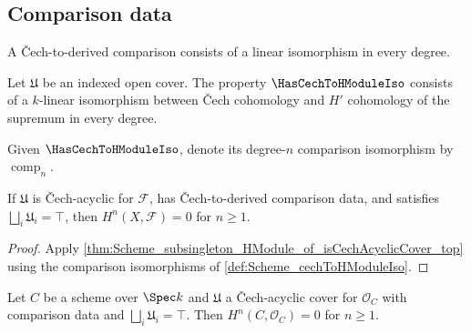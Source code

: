 \subsection{Comparison data}

A \v{C}ech-to-derived comparison consists of a linear isomorphism in every degree.

\begin{definition}\leanok
  \label{def:Scheme_HasCechToHModuleIso}

  Let \(\mathfrak U\) be an indexed open cover. The property \(\HasCechToHModuleIso\) consists of a \(k\)-linear isomorphism between \v{C}ech cohomology and \(H'\) cohomology of the supremum in every degree.
\end{definition}

\begin{definition}\leanok
  \label{def:Scheme_cechToHModuleIso}

  Given \(\HasCechToHModuleIso\), denote its degree-\(n\) comparison isomorphism by \(\operatorname{comp}_n\).
\end{definition}

\begin{theorem}\leanok
  \label{thm:Scheme_subsingleton_HModule_of_hasCechToHModuleIso_top}

  If \(\mathfrak U\) is \v{C}ech-acyclic for \(\mathcal F\), has \v{C}ech-to-derived comparison data, and satisfies \(\bigsqcup_i\mathfrak U_i=\top\), then \(H^n(X,\mathcal F)=0\) for \(n\geq1\).
\end{theorem}

\begin{proof}


\leanok
  Apply \cref{thm:Scheme_subsingleton_HModule_of_isCechAcyclicCover_top} using the comparison isomorphisms of \cref{def:Scheme_cechToHModuleIso}.
\end{proof}

\begin{theorem}\leanok
  \label{thm:Scheme_subsingleton_HModule_of_hasCechToHModuleIso_top_curve}

  Let \(C\) be a scheme over \(\Spec k\) and \(\mathfrak U\) a \v{C}ech-acyclic cover for \(\mathcal O_C\) with comparison data and \(\bigsqcup_i\mathfrak U_i=\top\). Then \(H^n(C,\mathcal O_C)=0\) for \(n\geq1\).
\end{theorem}

